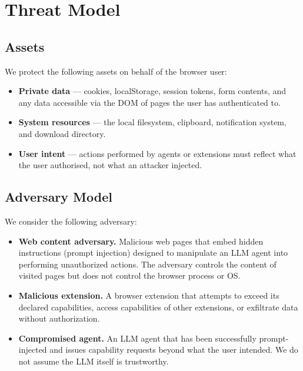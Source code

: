 
\section{Threat Model}
\label{sec:threat_model}

\subsection{Assets}

We protect the following assets on behalf of the browser user:

\begin{itemize}
  \item \textbf{Private data} — cookies, localStorage, session
    tokens, form contents, and any data accessible via the DOM
    of pages the user has authenticated to.
  \item \textbf{System resources} — the local filesystem,
    clipboard, notification system, and download directory.
  \item \textbf{User intent} — actions performed by agents or
    extensions must reflect what the user authorised, not
    what an attacker injected.
\end{itemize}

\subsection{Adversary Model}

We consider the following adversary:

\begin{itemize}
  \item \textbf{Web content adversary.} Malicious web pages
    that embed hidden instructions (prompt injection) designed
    to manipulate an LLM agent into performing unauthorized
    actions. The adversary controls the content of visited pages
    but does not control the browser process or OS.

  \item \textbf{Malicious extension.} A browser extension
    that attempts to exceed its declared capabilities, access
    capabilities of other extensions, or exfiltrate data
    without authorization.

  \item \textbf{Compromised agent.} An LLM agent that has
    been successfully prompt-injected and issues capability
    requests beyond what the user intended. We do not assume
    the LLM itself is trustworthy.
\end{itemize}

